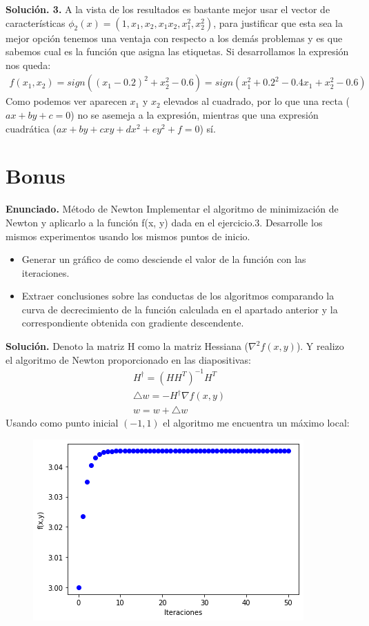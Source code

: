 \documentclass[a4paper,11pt]{article}
\begin{document}
\textbf{Solución. 3.}
A la vista de los resultados es bastante mejor usar el vector de características $\phi_2(x) = (1, x_1, x_2, x_1x_2, x_1^{2}, x_2^{2})$, para justificar que esta sea la mejor opción tenemos una ventaja con respecto a los demás problemas y es que sabemos cual es la función que asigna las etiquetas. Si desarrollamos la expresión nos queda:
\begin{align*}
f(x_1, x_2) = sign((x_1 - 0.2)^{2} + x_2^{2}- 0.6)
=sign(x_1^{2} + 0.2^{2} - 0.4x_1 + x_2^{2}- 0.6)
\end{align*}
Como podemos ver aparecen $x_1$ y $x_2$ elevados al cuadrado, por lo que una recta ($ax+by+c=0$) no se asemeja a la expresión, mientras que una expresión cuadrática ($ax+by+cxy+dx^2+ey^2+f=0$) sí.


\section{Bonus}
\textbf{Enunciado.} Método de Newton Implementar el algoritmo de minimización de Newton
y aplicarlo a la función f(x, y) dada en el ejercicio.3. Desarrolle los mismos experimentos usando los mismos puntos de inicio.

\begin{itemize}
\item Generar un gráfico de como desciende el valor de la función con las iteraciones.
\item Extraer conclusiones sobre las conductas de los algoritmos comparando la curva de decrecimiento de la función calculada en el apartado anterior y la correspondiente obtenida con gradiente descendente.
\end{itemize}

\textbf{Solución.}
Denoto la matriz H como la matriz Hessiana ($\nabla^2f(x,y)$). Y realizo el algoritmo de Newton proporcionado en las diapositivas:
\begin{align*}
H^{\dagger}=(HH^{T})^{-1}H^{T} \\ \triangle w=-H^{\dagger}\nabla f(x,y) \\
w=w+\triangle w
\end{align*}
Usando como punto inicial $(-1,1)$ el algoritmo me encuentra un máximo local:
\begin{figure}[h]
\includegraphics[scale=0.5]{bonus}
\centering
\end{figure}
\end{document}
